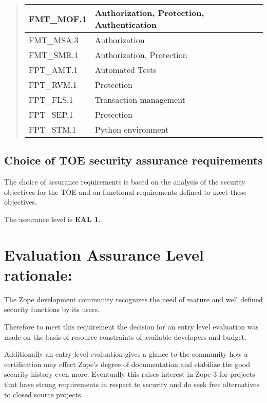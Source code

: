 \documentclass[12pt,english]{scrbook}
\begin{document}
\begin{quote}
\begin{longtable}[c]{|l|l|}
FMT{\_}MOF.1
 & 
Authorization, Protection, Authentication
 \\
\hline

FMT{\_}MSA.3
 & 
Authorization
 \\
\hline

FMT{\_}SMR.1
 & 
Authorization, Protection
 \\
\hline

FPT{\_}AMT.1
 & 
Automated Tests
 \\
\hline

FPT{\_}RVM.1
 & 
Protection
 \\
\hline

FPT{\_}FLS.1
 & 
Transaction management
 \\
\hline

FPT{\_}SEP.1
 & 
Protection
 \\
\hline

FPT{\_}STM.1
 & 
Python environment
 \\
\hline
\end{longtable}
\end{quote}




\subsection{Choice of TOE security assurance requirements}

The choice of assurance requirements is based on the analysis of the security
objectives for the TOE and on functional requirements defined to meet these
objectives.

The assurance level is \textbf{EAL 1}.




\section{Evaluation Assurance Level rationale:}

The Zope development community recognizes the need of mature and well defined
security functions by its users.

Therefore to meet this requirement the decision for an entry level evaluation
was made on the basis of resource constraints of available developers and
budget.

Additionally an entry level evaluation gives a glance to the community how a
certification may effect Zope's degree of documentation and stabilize the good
security history even more. Eventually this raises interest in Zope 3 for
projects that have strong requirements in respect to security and do seek free
alternatives to closed source projects.
\end{document}
